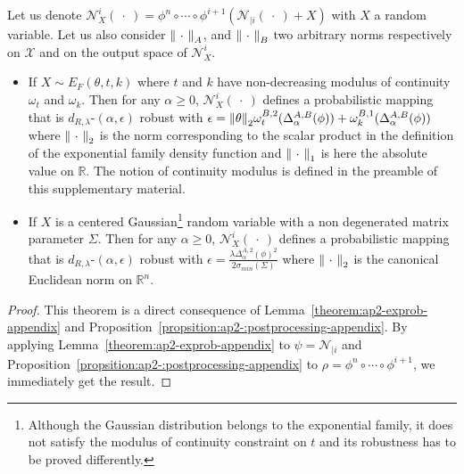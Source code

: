 \begin{theorem}
\label{theorem:ap2-netrob-appendix}
Let us denote $\mathcal{N}_{X}^i(\ \cdot\ )=\phi^n\circ \cdots \circ\phi^{i+1}(\mathcal{N}_{|i}(\ \cdot\ )+X)$ with $X$ a random variable. Let us also consider $\norm{\ \cdot\ }_{A}$, and $\norm{\ \cdot\ }_{B}$ two arbitrary norms respectively on $\mathcal{X}$ and on the output space of $\mathcal{N}_{X}^i$.




\begin{itemize}
  \item If $X\sim E_{F}(\theta,t,k)$  where $t$ and $k$ have non-decreasing modulus of continuity $\omega_t$ and $\omega_k$. Then for any $\alpha \geq 0$, $\mathcal{N}_{X}^i(\ \cdot\ )$ defines a probabilistic mapping that is $d_{R,\lambda}$-$(\alpha,\epsilon)$ robust with $\epsilon = \norm{\theta}_2 \omega^{B,2}_t(\Delta^{A,B}_{\alpha}(\phi)) +\omega_k^{B,1}(\Delta^{A,B}_{\alpha}(\phi)) $ where $\norm{\ \cdot\ }_2$ is the norm corresponding to the scalar product in the definition of the exponential family density function and $\norm{\ \cdot\ }_1$ is here the absolute value on $\mathbb{R}$. The notion of continuity modulus is defined in the preamble of this supplementary material.
    
\item If $X$ is a centered Gaussian\footnote{Although the Gaussian distribution belongs to the exponential family, it does not satisfy the modulus of continuity constraint on $t$ and its robustness has to be proved differently.} random variable with a non degenerated matrix parameter $\Sigma$. Then for any $\alpha \geq 0$, $\mathcal{N}_{X}^i(\ \cdot\ )$ defines a probabilistic mapping that is $d_{R,\lambda}$-$(\alpha,\epsilon)$ robust
with $ \epsilon = \frac{\lambda \Delta^{A,2}_{\alpha}(\phi)^2 }{2 \sigma_{min}(\Sigma) } $ where $\norm{\ \cdot\ }_2$ is the canonical Euclidean norm on $\mathbb{R}^n$.
\end{itemize}
\end{theorem}



\begin{proof}
This theorem is a direct consequence of Lemma~\ref{theorem:ap2-exprob-appendix} and Proposition~\ref{propsition:ap2-:postprocessing-appendix}. By applying Lemma~\ref{theorem:ap2-exprob-appendix} to $\psi=\mathcal{N}_{|i}$ and Proposition~\ref{propsition:ap2-:postprocessing-appendix} to $\rho=\phi^n\circ \cdots \circ\phi^{i+1}$, we immediately get the result.
\end{proof}

